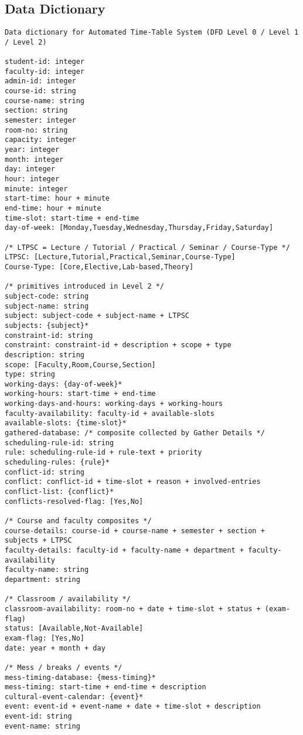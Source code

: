 \documentclass[12pt]{article}
\begin{document}
\subsection{Data Dictionary}
\small{
\begin{verbatim}
Data dictionary for Automated Time-Table System (DFD Level 0 / Level 1 / Level 2) 

student-id: integer
faculty-id: integer
admin-id: integer
course-id: string
course-name: string
section: string
semester: integer
room-no: string
capacity: integer
year: integer
month: integer
day: integer
hour: integer
minute: integer
start-time: hour + minute
end-time: hour + minute
time-slot: start-time + end-time
day-of-week: [Monday,Tuesday,Wednesday,Thursday,Friday,Saturday]

/* LTPSC = Lecture / Tutorial / Practical / Seminar / Course-Type */
LTPSC: [Lecture,Tutorial,Practical,Seminar,Course-Type]
Course-Type: [Core,Elective,Lab-based,Theory]

/* primitives introduced in Level 2 */
subject-code: string
subject-name: string
subject: subject-code + subject-name + LTPSC
subjects: {subject}*
constraint-id: string
constraint: constraint-id + description + scope + type
description: string
scope: [Faculty,Room,Course,Section]
type: string
working-days: {day-of-week}*
working-hours: start-time + end-time
working-days-and-hours: working-days + working-hours
faculty-availability: faculty-id + available-slots
available-slots: {time-slot}*
gathered-database: /* composite collected by Gather Details */ 
scheduling-rule-id: string
rule: scheduling-rule-id + rule-text + priority
scheduling-rules: {rule}*
conflict-id: string
conflict: conflict-id + time-slot + reason + involved-entries
conflict-list: {conflict}*
conflicts-resolved-flag: [Yes,No]

/* Course and faculty composites */
course-details: course-id + course-name + semester + section + subjects + LTPSC
faculty-details: faculty-id + faculty-name + department + faculty-availability
faculty-name: string
department: string

/* Classroom / availability */
classroom-availability: room-no + date + time-slot + status + (exam-flag)
status: [Available,Not-Available]
exam-flag: [Yes,No]
date: year + month + day

/* Mess / breaks / events */
mess-timing-database: {mess-timing}*
mess-timing: start-time + end-time + description
cultural-event-calendar: {event}*
event: event-id + event-name + date + time-slot + description
event-id: string
event-name: string


\end{verbatim}}
\end{document}
